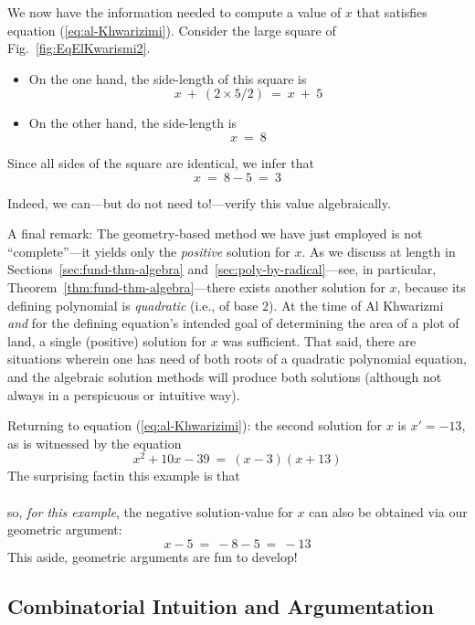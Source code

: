 \smallskip

We now have the information needed to compute a value of $x$ that
satisfies equation (\ref{eq:al-Khwarizimi}).  Consider the large
square of Fig.~\ref{fig:EqElKwarismi2}.

\begin{itemize}
\item
On the one hand, the side-length of this square is
\[ x \ + \ (2 \times 5/2) \ = \ x \ + \ 5 \]

\item
On the other hand, the side-length is
\[ x \ = \ 8 \]
\end{itemize}
Since all sides of the square are identical, we infer that
\[ x \ = \ 8-5 \ = \ 3 \]

Indeed, we can---but do not need to!---verify this value
algebraically.

\medskip

A final remark: The geometry-based method we have just employed is not
``complete''---it yields only the {\em positive} solution for $x$.  As
we discuss at length in Sections~\ref{sec:fund-thm-algebra}
and~\ref{sec:poly-by-radical}---see, in particular,
Theorem~\ref{thm:fund-thm-algebra}---there exists another solution for
$x$, because its defining polynomial is {\em quadratic} (i.e., of base
$2$).  At the time of Al Khwarizmi {\em and} for the defining
equation's intended goal of determining the area of a plot of land, a
single (positive) solution for $x$ was sufficient.  That said, there
are situations wherein one has need of both roots of a quadratic
polynomial equation, and the algebraic solution methods will produce
both solutions (although not always in a perspicuous or intuitive
way).

Returning to equation (\ref{eq:al-Khwarizimi}):  the second solution
for $x$  is $x' = -13$, as is witnessed by the equation
\[ x^2 + 10x - 39 \ = \ (x-3)(x+13) \]
The surprising factin this example is that \\
\hspace*{.2in}{\em $64$ is also the square of $-8$} \\
so, {\em for this example}, the negative solution-value for $x$ can
also be obtained via our geometric argument:
\[ x - 5 \ = \ -8 -5 \ = \ -13 \]
This aside, geometric arguments are fun to develop!


\subsection{Combinatorial Intuition and Argumentation}
\label{sec:comb-proofs}

